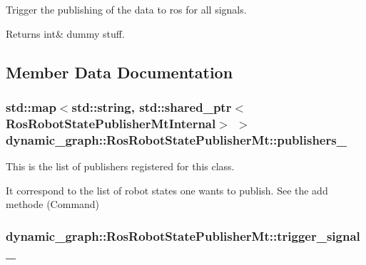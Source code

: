 Trigger the publishing of the data to ros for all signals. 

\begin{DoxyReturn}{Returns}
int\& dummy stuff. 
\end{DoxyReturn}


\subsection{Member Data Documentation}
\subsubsection[{\texorpdfstring{publishers\+\_\+}{publishers_}}]{\setlength{\rightskip}{0pt plus 5cm}std\+::map$<$std\+::string, std\+::shared\+\_\+ptr$<${\bf Ros\+Robot\+State\+Publisher\+Mt\+Internal}$>$ $>$ dynamic\+\_\+graph\+::\+Ros\+Robot\+State\+Publisher\+Mt\+::publishers\+\_\+\hspace{0.3cm}{\ttfamily [private]}}\hypertarget{classdynamic__graph_1_1RosRobotStatePublisherMt_a0ff7fbacd021e14f3abcae8dbd5c4ec0}{}\label{classdynamic__graph_1_1RosRobotStatePublisherMt_a0ff7fbacd021e14f3abcae8dbd5c4ec0}


This is the list of publishers registered for this class. 

It correspond to the list of robot states one wants to publish. See the add methode (Command) 
\subsubsection[{\texorpdfstring{trigger\+\_\+signal\+\_\+}{trigger_signal_}}]{ dynamic\+\_\+graph\+::\+Ros\+Robot\+State\+Publisher\+Mt\+::trigger\+\_\+signal\+\_\+\hspace{0.3cm}{\ttfamily [private]}}\hypertarget{classdynamic__graph_1_1RosRobotStatePublisherMt_af44e1e178bd62374b9b77a630d66ae71}{}\label{classdynamic__graph_1_1RosRobotStatePublisherMt_af44e1e178bd62374b9b77a630d66ae71}


